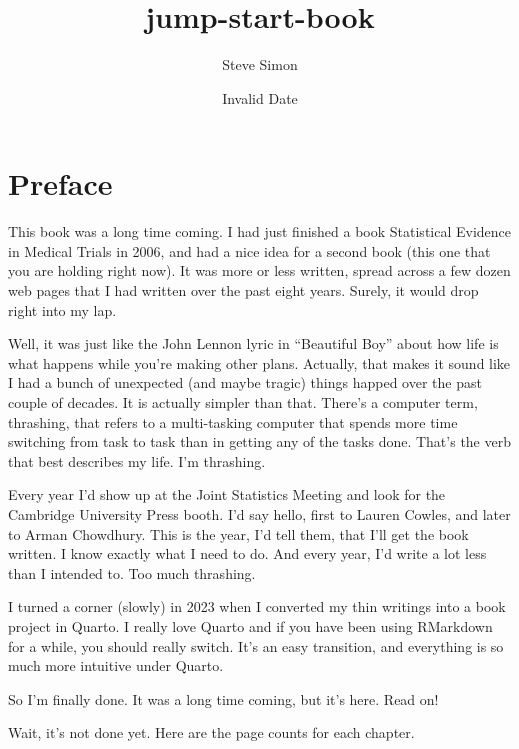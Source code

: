 \documentclass[
  letterpaper,
  DIV=11,
  numbers=noendperiod]{scrreprt}
\title{jump-start-book}
\author{Steve Simon}
\date{Invalid Date}
\renewcommand*\contentsname{Table of contents}
\newcommand\contentsname{Table of contents}
\begin{document}
\maketitle

\renewcommand*\contentsname{Table of contents}
{
\hypersetup{linkcolor=}
\setcounter{tocdepth}{2}
\tableofcontents
}


\chapter*{Preface}\label{preface}


This book was a long time coming. I had just finished a book Statistical
Evidence in Medical Trials in 2006, and had a nice idea for a second
book (this one that you are holding right now). It was more or less
written, spread across a few dozen web pages that I had written over the
past eight years. Surely, it would drop right into my lap.

Well, it was just like the John Lennon lyric in ``Beautiful Boy'' about
how life is what happens while you're making other plans. Actually, that
makes it sound like I had a bunch of unexpected (and maybe tragic)
things happed over the past couple of decades. It is actually simpler
than that. There's a computer term, thrashing, that refers to a
multi-tasking computer that spends more time switching from task to task
than in getting any of the tasks done. That's the verb that best
describes my life. I'm thrashing.

Every year I'd show up at the Joint Statistics Meeting and look for the
Cambridge University Press booth. I'd say hello, first to Lauren Cowles,
and later to Arman Chowdhury. This is the year, I'd tell them, that I'll
get the book written. I know exactly what I need to do. And every year,
I'd write a lot less than I intended to. Too much thrashing.

I turned a corner (slowly) in 2023 when I converted my thin writings
into a book project in Quarto. I really love Quarto and if you have been
using RMarkdown for a while, you should really switch. It's an easy
transition, and everything is so much more intuitive under Quarto.

So I'm finally done. It was a long time coming, but it's here. Read on!

Wait, it's not done yet. Here are the page counts for each chapter.
\end{document}
